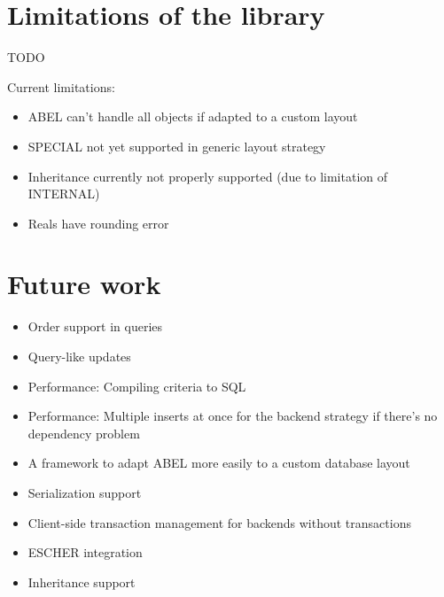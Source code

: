 
\section{Limitations of the library}
TODO

Current limitations:
\begin{itemize}
\item ABEL can't handle all objects if adapted to a custom layout
\item SPECIAL not yet supported in generic layout strategy
\item Inheritance currently not properly supported (due to limitation of INTERNAL)
\item Reals have rounding error
\end{itemize}

\section{Future work}
\begin{itemize}
 \item Order support in queries
 \item Query-like updates
 \item Performance: Compiling criteria to SQL
 \item Performance: Multiple inserts at once for the backend strategy if there's no dependency problem
 \item A framework to adapt ABEL more easily to a custom database layout
 \item Serialization support
 \item Client-side transaction management for backends without transactions
 \item ESCHER integration
 \item Inheritance support
\end{itemize}



